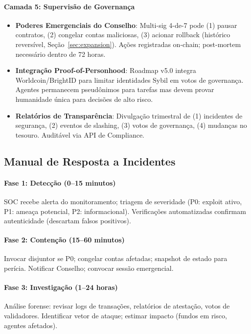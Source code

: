 \documentclass[11pt]{article}
\begin{document}
\begin{itemize}[noitemsep]
\begin{itemize}[noitemsep]
\begin{itemize}[noitemsep]
\paragraph{Camada 5: Supervisão de Governança}
\begin{itemize}[noitemsep]
  \item \textbf{Poderes Emergenciais do Conselho}: Multi-sig 4-de-7 pode (1) pausar contratos, (2) congelar contas maliciosas, (3) acionar rollback (histórico reversível, Seção~\ref{sec:expansion}). Ações registradas on-chain; post-mortem necessário dentro de 72 horas.
  \item \textbf{Integração Proof-of-Personhood}: Roadmap v5.0 integra Worldcoin/BrightID para limitar identidades Sybil em votos de governança. Agentes permanecem pseudônimos para tarefas mas devem provar humanidade única para decisões de alto risco.
  \item \textbf{Relatórios de Transparência}: Divulgação trimestral de (1) incidentes de segurança, (2) eventos de slashing, (3) votos de governança, (4) mudanças no tesouro. Auditável via API de Compliance.
\end{itemize}

\subsection{Manual de Resposta a Incidentes}

\paragraph{Fase 1: Detecção (0--15 minutos)}
SOC recebe alerta do monitoramento; triagem de severidade (P0: exploit ativo, P1: ameaça potencial, P2: informacional). Verificações automatizadas confirmam autenticidade (descartam falsos positivos).

\paragraph{Fase 2: Contenção (15--60 minutos)}
Invocar disjuntor se P0; congelar contas afetadas; snapshot de estado para perícia. Notificar Conselho; convocar sessão emergencial.

\paragraph{Fase 3: Investigação (1--24 horas)}
Análise forense: revisar logs de transações, relatórios de atestação, votos de validadores. Identificar vetor de ataque; estimar impacto (fundos em risco, agentes afetados).


\end{itemize}
\end{itemize}
\end{itemize}
\end{document}
